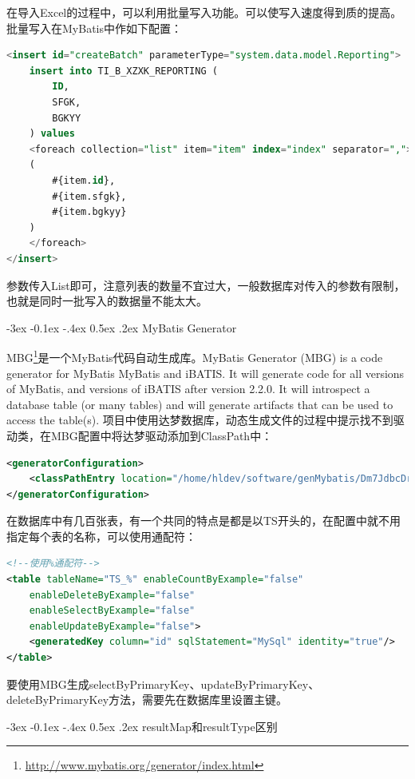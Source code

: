 \documentclass[12pt]{book}
\makeatletter
\numberwithin{dummy}{section}
\theoremstyle{ocrenumbox}
\theoremstyle{blacknumex}
\theoremstyle{blacknumbox}
\theoremstyle{ocrenum}
\renewcommand{\subsection}{\@startsection {subsection}{2}{\z@}
	{-3ex \@plus -0.1ex \@minus -.4ex}
	{0.5ex \@plus.2ex }
	{\normalfont\sffamily\bfseries}}
\makeatother
\begin{document}
在导入Excel的过程中，可以利用批量写入功能。可以使写入速度得到质的提高。批量写入在MyBatis中作如下配置：

\begin{lstlisting}[language=SQL]
<insert id="createBatch" parameterType="system.data.model.Reporting">
	insert into TI_B_XZXK_REPORTING (
		ID,
		SFGK,
		BGKYY
	) values
	<foreach collection="list" item="item" index="index" separator=",">
	(
		#{item.id},
		#{item.sfgk},
		#{item.bgkyy}
	)
	</foreach>
</insert>
\end{lstlisting}

参数传入List即可，注意列表的数量不宜过大，一般数据库对传入的参数有限制，也就是同时一批写入的数据量不能太大。

\subsection{MyBatis Generator}

MBG\footnote{\url{http://www.mybatis.org/generator/index.html}}是一个MyBatis代码自动生成库。MyBatis Generator (MBG) is a code generator for MyBatis MyBatis and iBATIS. It will generate code for all versions of MyBatis, and versions of iBATIS after version 2.2.0. It will introspect a database table (or many tables) and will generate artifacts that can be used to access the table(s). 项目中使用达梦数据库，动态生成文件的过程中提示找不到驱动类，在MBG配置中将达梦驱动添加到ClassPath中：

\begin{lstlisting}[language=XML]
<generatorConfiguration>
	<classPathEntry location="/home/hldev/software/genMybatis/Dm7JdbcDriver17.jar"/>
</generatorConfiguration>
\end{lstlisting}

在数据库中有几百张表，有一个共同的特点是都是以TS开头的，在配置中就不用指定每个表的名称，可以使用通配符：

\begin{lstlisting}[language=XML]
<!--使用%通配符-->
<table tableName="TS_%" enableCountByExample="false"
	enableDeleteByExample="false"
	enableSelectByExample="false"
	enableUpdateByExample="false">
	<generatedKey column="id" sqlStatement="MySql" identity="true"/>
</table>
\end{lstlisting}

要使用MBG生成selectByPrimaryKey、updateByPrimaryKey、deleteByPrimaryKey方法，需要先在数据库里设置主键。

\subsection{resultMap和resultType区别}
\end{document}
